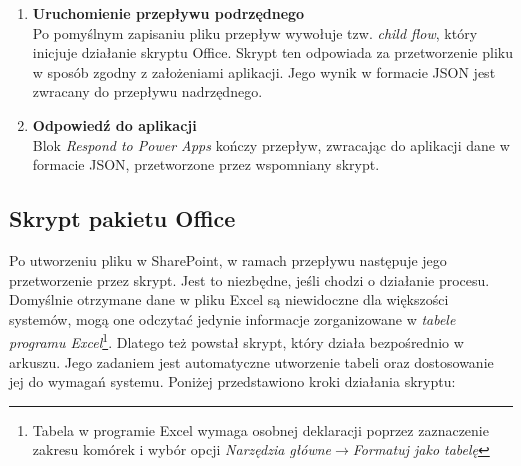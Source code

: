 \begin{enumerate}
    \item \textbf{Uruchomienie przepływu podrzędnego} \\
    Po pomyślnym zapisaniu pliku przepływ wywołuje tzw. \textit{child flow}, który inicjuje działanie skryptu Office. Skrypt ten odpowiada za przetworzenie pliku w sposób zgodny z założeniami aplikacji. Jego wynik w formacie JSON jest zwracany do przepływu nadrzędnego. 

    \item \textbf{Odpowiedź do aplikacji} \\
    Blok \textit{Respond to Power Apps} kończy przepływ, zwracając do aplikacji dane w formacie JSON, przetworzone przez wspomniany skrypt.
\end{enumerate}

\subsection{Skrypt pakietu Office}
Po utworzeniu pliku w SharePoint, w ramach przepływu następuje jego przetworzenie przez skrypt. Jest to niezbędne, jeśli chodzi o działanie procesu. Domyślnie otrzymane dane w pliku Excel są niewidoczne dla większości systemów, mogą one odczytać jedynie informacje zorganizowane w \emph{tabele programu Excel}\footnote{Tabela w programie Excel wymaga osobnej deklaracji poprzez zaznaczenie zakresu komórek i wybór opcji \emph{Narzędzia główne}$\to$\emph{Formatuj jako tabelę}}. Dlatego też powstał skrypt, który działa bezpośrednio w arkuszu. Jego zadaniem jest automatyczne utworzenie tabeli oraz dostosowanie jej do wymagań systemu. Poniżej przedstawiono kroki działania skryptu:

